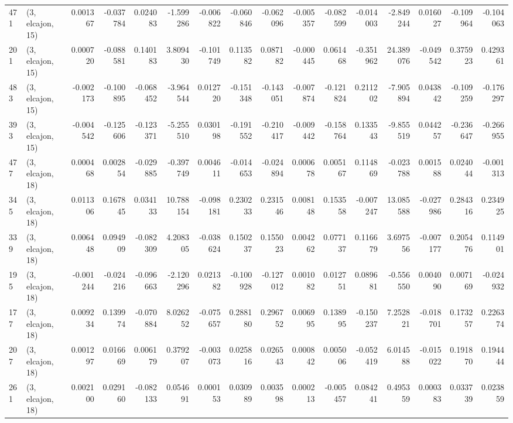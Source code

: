 \begin{tabular}{llrrrrrrrrrrrrrr}
471 &  (3, elcajon, 15) &   0.001367 & -0.037784 &  0.024083 &   -1.599286 & -0.006822 &  -0.060846 & -0.062096 & -0.005357 & -0.082599 & -0.014003 &   -2.849244 &  0.016027 & -0.109964 & -0.104063 \\
201 &  (3, elcajon, 15) &   0.000720 & -0.088581 &  0.140183 &    3.809430 & -0.101749 &   0.113582 &  0.087182 & -0.000445 &  0.061468 & -0.351962 &   24.389076 & -0.049542 &  0.375923 &  0.429361 \\
483 &  (3, elcajon, 15) &  -0.002173 & -0.100895 & -0.068452 &   -3.964544 &  0.012720 &  -0.151348 & -0.143051 & -0.007874 & -0.121824 &  0.211202 &   -7.905894 &  0.043842 & -0.109259 & -0.176297 \\
393 &  (3, elcajon, 15) &  -0.004542 & -0.125606 & -0.123371 &   -5.255510 &  0.030198 &  -0.191552 & -0.210417 & -0.009442 & -0.158764 &  0.133543 &   -9.855519 &  0.044257 & -0.236647 & -0.266955 \\
477 &  (3, elcajon, 18) &   0.000468 &  0.002854 & -0.029885 &   -0.397749 &  0.004611 &  -0.014653 & -0.024894 &  0.000678 &  0.005167 &  0.114869 &   -0.023788 &  0.001588 &  0.024044 & -0.001313 \\
345 &  (3, elcajon, 18) &   0.011306 &  0.167845 &  0.034133 &   10.788154 & -0.098181 &   0.230233 &  0.231546 &  0.008148 &  0.153558 & -0.007247 &   13.085588 & -0.027986 &  0.284316 &  0.234925 \\
339 &  (3, elcajon, 18) &   0.006448 &  0.094909 & -0.082309 &    4.208305 & -0.038624 &   0.150237 &  0.155023 &  0.004262 &  0.077137 &  0.116679 &    3.697556 & -0.007177 &  0.205476 &  0.114901 \\
195 &  (3, elcajon, 18) &  -0.001244 & -0.024216 & -0.096663 &   -2.120296 &  0.021382 &  -0.100928 & -0.127012 &  0.001082 &  0.012751 &  0.089681 &   -0.556550 &  0.004090 &  0.007169 & -0.024932 \\
177 &  (3, elcajon, 18) &   0.009234 &  0.139974 & -0.070884 &    8.026252 & -0.075657 &   0.288180 &  0.296752 &  0.006995 &  0.138995 & -0.150237 &    7.252821 & -0.018701 &  0.173257 &  0.226374 \\
207 &  (3, elcajon, 18) &   0.001297 &  0.016669 &  0.006179 &    0.379207 & -0.003073 &   0.025816 &  0.026543 &  0.000842 &  0.005006 & -0.052419 &    6.014588 & -0.015022 &  0.191870 &  0.194444 \\
261 &  (3, elcajon, 18) &   0.002100 &  0.029160 & -0.082133 &    0.054691 &  0.000153 &   0.030989 &  0.003598 &  0.000213 & -0.005457 &  0.084241 &    0.495359 &  0.000383 &  0.033739 &  0.023859 \\

\end{tabular}
